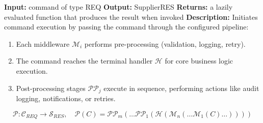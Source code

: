 \begin{algorithm}[H]
\caption{CommandPipeline (\emph{Interface})}
\begin{algorithmic}[1]
    \State \textbf{Input:} command of type \textlangle REQ\textrangle
    \State \textbf{Output:} Supplier\textlangle RES\textrangle
    \State \textbf{Returns:} a lazily evaluated function that produces the result when invoked
    \State \textbf{Description:} 
    Initiates command execution by passing the command through the configured pipeline:
    \begin{enumerate}
        \item Each middleware $\mathcal{M}_i$ performs pre-processing (validation, logging, retry).
        \item The command reaches the terminal handler $\mathcal{H}$ for core business logic execution.
        \item Post-processing stages $\mathcal{P\!P}_j$ execute in sequence, performing actions like audit logging, notifications, or retries.
    \end{enumerate}
    \[
        \mathcal{P} : \mathcal{C}_{REQ} \rightarrow \mathcal{S}_{RES}, \quad
        \mathcal{P}(C) = \mathcal{P\!P}_m(\dots \mathcal{P\!P}_1(\mathcal{H}(\mathcal{M}_n(\dots \mathcal{M}_1(C) \dots)))) 
    \]
\EndProcedure
\end{algorithmic}
\end{algorithm}